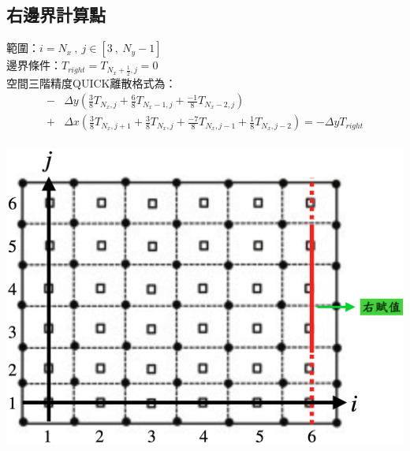 \documentclass[12pt]{article}
\begin{document}
\subsection{右邊界計算點}
 \begin{minipage}{0.6\textwidth}
   \noindent 範圍：$i=N_{x}\ ,\ j\in[3\ ,\ N_{y}-1]$\\[1.5ex]
   \noindent 邊界條件：$T_{right} = T_{N_{x}+\frac{1}{2},j}= 0$\\[1.5ex]
   \noindent 空間三階精度QUICK離散格式為：
   \begin{equation*}\label{eq:QUICK2}\begin{split}
   -&\Delta y(\frac{3}{8}T_{N_{x},j} + \frac{6}{8}T_{N_{x}-1,j} + \frac{-1}{8}T_{N_{x}-2,j}) \\[1.5ex] 
   +& \Delta x (\frac{3}{8}T_{N_{x},j+1} + \frac{3}{8}T_{N_{x},j} +  \frac{-7}{8}T_{N_{x},j-1}+ \frac{1}{8}T_{N_{x},j-2}) = -\Delta y T_{right} \\[1.5ex]
   \end{split}\end{equation*}
   \end{minipage}%
   \hfill
   \begin{minipage}{0.34\textwidth}
   \centering
   \includegraphics[width=\linewidth,height=9\baselineskip]{15.png}
   \label{fig:2boundary}
\end{minipage}
\end{document}
